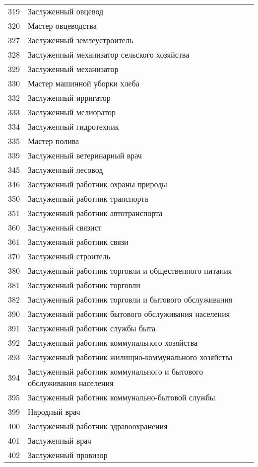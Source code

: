 \documentclass[10pt, a4paper, titlepage]{article}
\begin{document}
\begin{xtabular}{rp{.38\textwidth}}
    319 & Заслуженный овцевод \\
    320 & Мастер овцеводства \\
    327 & Заслуженный землеустроитель \\
    328 & Заслуженный механизатор сельского хозяйства \\
    329 & Заслуженный механизатор \\
    330 & Мастер машинной уборки хлеба \\
    332 & Заслуженный ирригатор \\
    333 & Заслуженный мелиоратор \\
    334 & Заслуженный гидротехник \\
    335 & Мастер полива \\
    339 & Заслуженный ветеринарный врач \\
    345 & Заслуженный лесовод \\
    346 & Заслуженный работник охраны природы \\
    350 & Заслуженный работник транспорта \\
    351 & Заслуженный работник автотранспорта \\
    360 & Заслуженный связист \\
    361 & Заслуженный работник связи \\
    370 & Заслуженный строитель \\
    380 & Заслуженный работник торговли и общественного питания \\
    381 & Заслуженный работник торговли \\
    382 & Заслуженный работник торговли и бытового обслуживания \\
    390 & Заслуженный работник бытового обслуживания населения \\
    391 & Заслуженный работник службы быта \\
    392 & Заслуженный работник коммунального хозяйства \\
    393 & Заслуженный работник жилищно-коммунального хозяйства \\
    394 & Заслуженный работник коммунального и бытового обслуживания населения \\
    395 & Заслуженный работник коммунально-бытовой службы \\
    399 & Народный врач \\
    400 & Заслуженный работник здравоохранения \\
    401 & Заслуженный врач \\
    402 & Заслуженный провизор \\

\end{xtabular}
\end{document}
